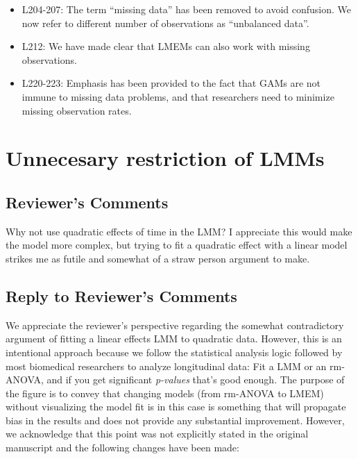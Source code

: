 \documentclass[
]{article}
\begin{document}
\begin{itemize}
\item
  L204-207: The term ``missing data'' has been removed to avoid confusion. We now refer to different number of observations as ``unbalanced data''.
\item
  L212: We have made clear that LMEMs can also work with missing observations.
\item
  L220-223: Emphasis has been provided to the fact that GAMs are not immune to missing data problems, and that researchers need to minimize missing observation rates.
\end{itemize}

\hypertarget{unnecesary-restriction-of-lmms}{%
\section{Unnecesary restriction of LMMs}\label{unnecesary-restriction-of-lmms}}

\hypertarget{reviewers-comments-1}{%
\subsection{Reviewer's Comments}\label{reviewers-comments-1}}

Why not use quadratic effects of time in the LMM? I appreciate this would make the model more complex, but trying to fit a quadratic effect with a linear model strikes me as futile and somewhat of a straw person argument to make.

\hypertarget{section-2}{%
\subsection{\texorpdfstring{\textcolor{reviewersblue} {Reply to Reviewer's Comments}}{}}\label{section-2}}

We appreciate the reviewer's perspective regarding the somewhat contradictory argument of fitting a linear effects LMM to quadratic data. However, this is an intentional approach because we follow the statistical analysis logic followed by most biomedical researchers to analyze longitudinal data: Fit a LMM or an rm-ANOVA, and if you get significant \emph{p-values} that's good enough. The purpose of the figure is to convey that changing models (from rm-ANOVA to LMEM) without visualizing the model fit is in this case is something that will propagate bias in the results and does not provide any substantial improvement. However, we acknowledge that this point was not explicitly stated in the original manuscript and the following changes have been made:
\end{document}
